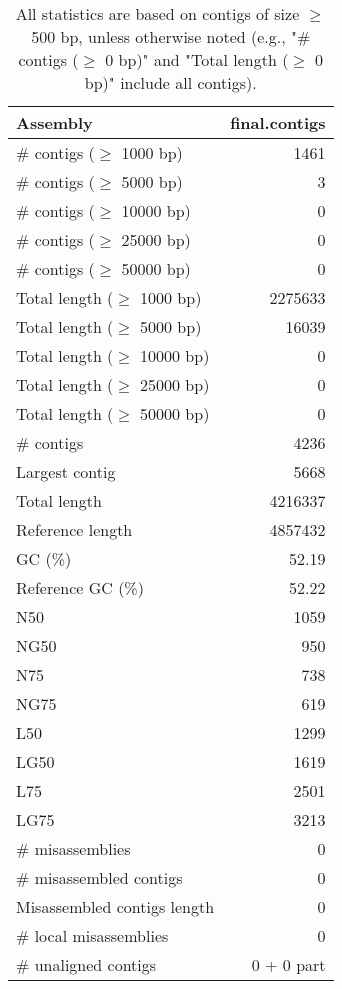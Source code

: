 \documentclass[12pt,a4paper]{article}
\begin{document}
\begin{table}[ht]
\begin{center}
\caption{All statistics are based on contigs of size $\geq$ 500 bp, unless otherwise noted (e.g., "\# contigs ($\geq$ 0 bp)" and "Total length ($\geq$ 0 bp)" include all contigs).}
\begin{tabular}{|l*{1}{|r}|}
\hline
Assembly & final.contigs \\ \hline
\# contigs ($\geq$ 1000 bp) & 1461 \\ \hline
\# contigs ($\geq$ 5000 bp) & 3 \\ \hline
\# contigs ($\geq$ 10000 bp) & 0 \\ \hline
\# contigs ($\geq$ 25000 bp) & 0 \\ \hline
\# contigs ($\geq$ 50000 bp) & 0 \\ \hline
Total length ($\geq$ 1000 bp) & 2275633 \\ \hline
Total length ($\geq$ 5000 bp) & 16039 \\ \hline
Total length ($\geq$ 10000 bp) & 0 \\ \hline
Total length ($\geq$ 25000 bp) & 0 \\ \hline
Total length ($\geq$ 50000 bp) & 0 \\ \hline
\# contigs & 4236 \\ \hline
Largest contig & 5668 \\ \hline
Total length & 4216337 \\ \hline
Reference length & 4857432 \\ \hline
GC (\%) & 52.19 \\ \hline
Reference GC (\%) & 52.22 \\ \hline
N50 & 1059 \\ \hline
NG50 & 950 \\ \hline
N75 & 738 \\ \hline
NG75 & 619 \\ \hline
L50 & 1299 \\ \hline
LG50 & 1619 \\ \hline
L75 & 2501 \\ \hline
LG75 & 3213 \\ \hline
\# misassemblies & 0 \\ \hline
\# misassembled contigs & 0 \\ \hline
Misassembled contigs length & 0 \\ \hline
\# local misassemblies & 0 \\ \hline
\# unaligned contigs & 0 + 0 part \\ \hline

\end{tabular}
\end{center}
\end{table}
\end{document}
